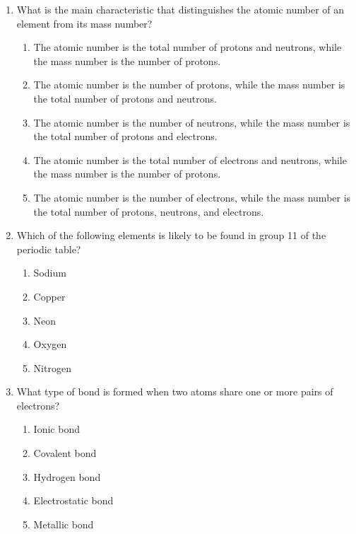\documentclass[12pt]{article}
\newenvironment{questionblock}[1][10]{
    \par\Needspace{#1\baselineskip}
}{
    \par
}
\begin{document}
\begin{enumerate}
\begin{enumerate}[label=(\roman*)]
    \begin{questionblock}
      \item What is the main characteristic that distinguishes the atomic number of an element from its mass number?
      \begin{enumerate}[label=\Alph*.]
        \item The atomic number is the total number of protons and neutrons, while the mass number is the number of protons.
        \item The atomic number is the number of protons, while the mass number is the total number of protons and neutrons.
        \item The atomic number is the number of neutrons, while the mass number is the total number of protons and electrons.
        \item The atomic number is the total number of electrons and neutrons, while the mass number is the number of protons.
        \item The atomic number is the number of electrons, while the mass number is the total number of protons, neutrons, and electrons.
      \end{enumerate}
      \vspace{0.8em}
    \end{questionblock}

    \begin{questionblock}
      \item Which of the following elements is likely to be found in group 11 of the periodic table?
      \begin{enumerate}[label=\Alph*.]
        \item Sodium
        \item Copper
        \item Neon
        \item Oxygen
        \item Nitrogen
      \end{enumerate}
      \vspace{0.8em}
    \end{questionblock}

    \begin{questionblock}
      \item What type of bond is formed when two atoms share one or more pairs of electrons?
      \begin{enumerate}[label=\Alph*.]
        \item Ionic bond
        \item Covalent bond
        \item Hydrogen bond
        \item Electrostatic bond
        \item Metallic bond
      \end{enumerate}
      \vspace{0.8em}
    \end{questionblock}


\end{enumerate}
\end{enumerate}
\end{document}
